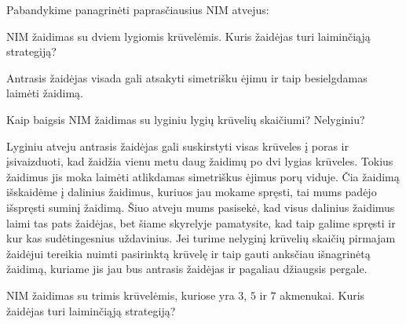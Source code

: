Pabandykime panagrinėti paprasčiausius NIM atvejus:

\begin{pavnr}
NIM žaidimas su dviem lygiomis krūvelėmis. Kuris žaidėjas turi laiminčiąją strategiją?
\end{pavnr}

\begin{sprendimas}
Antrasis žaidėjas visada gali atsakyti simetrišku ėjimu ir taip besielgdamas laimėti žaidimą.
\end{sprendimas}

\begin{pavnr}
 Kaip baigsis NIM žaidimas su lyginiu lygių krūvelių skaičiumi? Nelyginiu? 
\end{pavnr}

\begin{sprendimas}
Lyginiu atveju antrasis žaidėjas gali suskirstyti visas krūveles į poras ir įsivaizduoti, kad žaidžia vienu metu daug žaidimų po dvi lygias krūveles. Tokius žaidimus jis moka laimėti atlikdamas simetriškus ėjimus porų viduje.
Čia žaidimą išskaidėme į dalinius žaidimus, kuriuos jau mokame spręsti, tai mums padėjo išspręsti suminį žaidimą. Šiuo atveju mums pasisekė, kad visus dalinius žaidimus laimi tas pats žaidėjas, bet šiame skyrelyje pamatysite, 
kad taip galime spręsti ir kur kas sudėtingesnius uždavinius. Jei turime nelyginį krūvelių skaičių pirmajam žaidėjui tereikia nuimti pasirinktą krūvelę ir taip gauti anksčiau išnagrinėtą žaidimą, kuriame jis jau bus antrasis žaidėjas ir pagaliau džiaugsis pergale. 
\end{sprendimas}

\begin{pavnr}
  NIM žaidimas su trimis krūvelėmis, kuriose yra $3$, $5$ ir $7$ akmenukai. Kuris
  žaidėjas turi laiminčiąją strategiją?
\end{pavnr}

